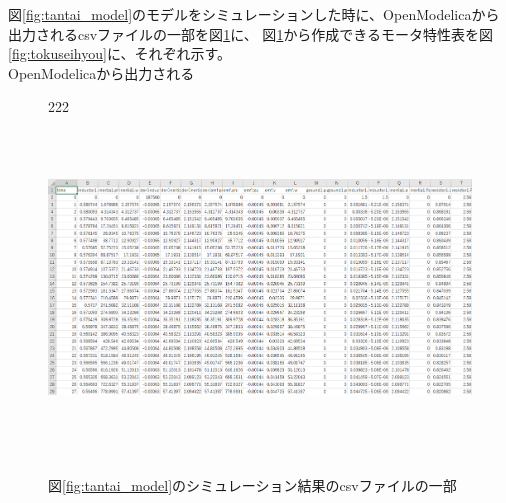 図\ref{fig:tantai_model}のモデルをシミュレーションした時に、OpenModelicaから出力されるcsvファイルの一部を図\ref{fig:simyu_csv}に、
図\ref{fig:simyu_csv}から作成できるモータ特性表を図\ref{fig:tokuseihyou}に、それぞれ示す。\\

OpenModelicaから出力される
\fboxsep=0pt
\begin{figure}[t]222
	\centering
	\includegraphics[width=16.5cm,height=9cm]{./Image/simyu_csv.png}
	\caption{図\ref{fig:tantai_model}のシミュレーション結果のcsvファイルの一部}
	\label{fig:simyu_csv}
\end{figure}

